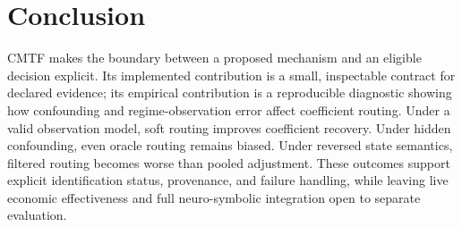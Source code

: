 \section{Conclusion}
CMTF makes the boundary between a proposed mechanism and an eligible decision explicit. Its implemented contribution is a small, inspectable contract for declared evidence; its empirical contribution is a reproducible diagnostic showing how confounding and regime-observation error affect coefficient routing. Under a valid observation model, soft routing improves coefficient recovery. Under hidden confounding, even oracle routing remains biased. Under reversed state semantics, filtered routing becomes worse than pooled adjustment. These outcomes support explicit identification status, provenance, and failure handling, while leaving live economic effectiveness and full neuro-symbolic integration open to separate evaluation.
